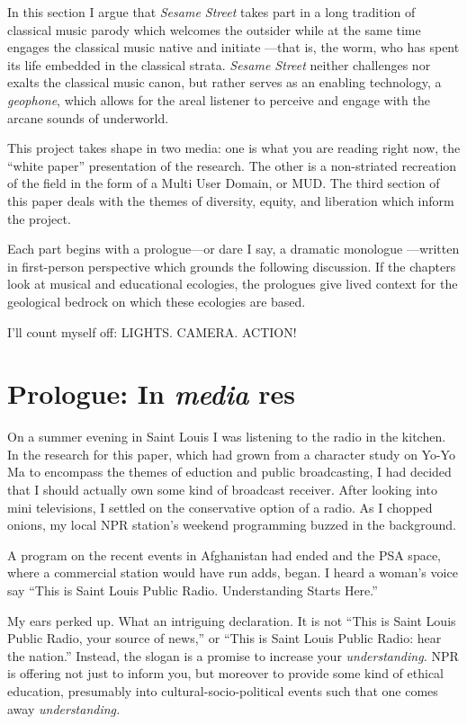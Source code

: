\documentclass[12pt,letterpaper]{article}
\begin{document}
	In this section I argue that \textit{Sesame Street} takes part in a
	long tradition of classical music parody which welcomes the outsider
	while at the same time engages the classical music native and initiate
	---that is, the worm, who has spent its life embedded in the classical
	strata.
	\textit{Sesame Street} neither challenges nor exalts the classical 
	music canon, but rather serves as an enabling technology, a 
	\textit{geophone}, which allows for the areal listener to perceive and  
	engage with the arcane sounds of underworld.  

	This project takes shape in two media: one is what you are reading 
	right now, the 
	``white paper'' presentation of the research. The other is a 
	non-striated recreation of the field in the form of a Multi User 
	Domain, or MUD. The third section of this paper deals with the themes
	of diversity,
	equity, and liberation which inform the project.  

	Each part begins with a prologue---or dare I say, a dramatic monologue
	---written in first-person perspective
	which grounds the following discussion. If the chapters look at
	musical and educational ecologies, the prologues give lived context for
	the geological bedrock on which these ecologies are based.  

	I'll count myself off: LIGHTS. CAMERA. ACTION!	

	\newpage	
	\section*{Prologue: In \textit{media} res}
	
	\noindent
	On a summer evening in Saint Louis I was listening to the radio in
	the kitchen. In the research for this paper, which had grown from a 
	character
	study on Yo-Yo Ma to encompass the themes of eduction and public 
	broadcasting,
	I had decided that I should actually own some kind of broadcast 
	receiver. 
	After looking into mini televisions, I settled on the conservative 
	option
	of a radio. As I chopped onions, my local NPR station's weekend 
	programming
	buzzed in the background.
	
	A program on the recent events in Afghanistan had ended and the PSA 
	space, where a commercial station
	would have run adds, began. I heard a woman's voice say ``This is Saint
	Louis Public Radio. Understanding Starts Here.'' 

	My ears perked up. What an intriguing declaration. It is not ``This is 
	Saint Louis Public Radio, your source of news,'' or ``This is Saint 
	Louis Public Radio: hear the nation.'' Instead, the 
	slogan is a 
	promise to increase your \textit{understanding. }NPR is offering not
	just to 
	inform you, but moreover to provide some kind of ethical education,
	presumably into cultural-socio-political events such that one comes away
	\textit{understanding.}
\end{document}
